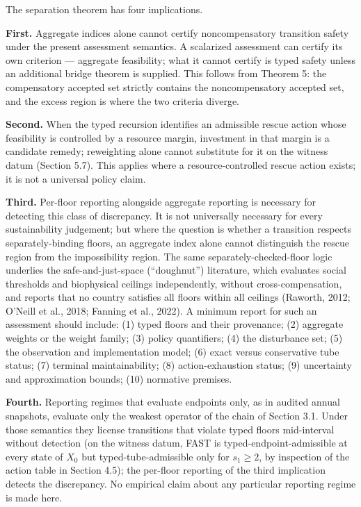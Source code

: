 \documentclass[3p,11pt]{elsarticle}
\begin{document}
The separation theorem has four implications.

\textbf{First.} Aggregate indices alone cannot certify noncompensatory
transition safety under the present assessment semantics. A scalarized
assessment can certify its own criterion --- aggregate feasibility; what
it cannot certify is typed safety unless an additional bridge theorem is
supplied. This follows from Theorem 5: the compensatory accepted set
strictly contains the noncompensatory accepted set, and the excess
region is where the two criteria diverge.

\textbf{Second.} When the typed recursion identifies an admissible
rescue action whose feasibility is controlled by a resource margin,
investment in that margin is a candidate remedy; reweighting alone cannot substitute for it on the witness datum (Section 5.7). This applies where a resource-controlled rescue action exists; it is not a universal policy claim.

\textbf{Third.} Per-floor reporting alongside aggregate reporting is
necessary for detecting this class of discrepancy. It is not universally
necessary for every sustainability judgement; but where the question is
whether a transition respects separately-binding floors, an aggregate
index alone cannot distinguish the rescue region from the impossibility region. The same separately-checked-floor logic underlies the safe-and-just-space (``doughnut'') literature, which evaluates social thresholds and biophysical ceilings independently, without cross-compensation, and reports that no country satisfies all floors within all ceilings (Raworth, 2012; O'Neill et al., 2018; Fanning et al., 2022). A minimum report for such an assessment should include: (1)
typed floors and their provenance; (2) aggregate weights or the weight
family; (3) policy quantifiers; (4) the disturbance set; (5) the
observation and implementation model; (6) exact versus conservative tube
status; (7) terminal maintainability; (8) action-exhaustion status; (9)
uncertainty and approximation bounds; (10) normative premises.

\textbf{Fourth.} Reporting regimes that evaluate endpoints only, as in audited annual snapshots, evaluate only the weakest operator of the chain of Section 3.1. Under those semantics they license transitions that violate typed floors mid-interval without detection (on the witness datum, FAST is typed-endpoint-admissible at every state of \(X_0\) but typed-tube-admissible only for \(s_1 \ge 2\), by inspection of the action table in Section 4.5); the per-floor reporting of the third implication detects the discrepancy. No empirical claim about any particular reporting regime is made here.
\end{document}
